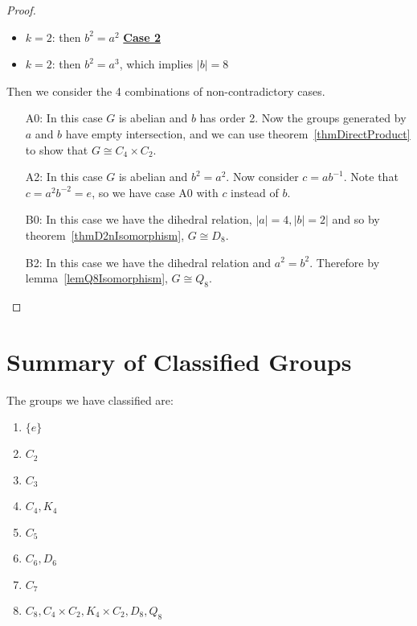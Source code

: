 \documentclass[../Main.tex]{subfiles}
\begin{document}
\begin{proof}
\begin{itemize}
        \item \underline{$k = 2$}: then $b^2 = a^2$ \underline{\textbf{Case 2}}
        \item \underline{$k = 2$}: then $b^2 = a^3$, which implies $|b| =  8$ \contradiction
    \end{itemize}
    Then we consider the 4 combinations of non-contradictory cases.
    \begin{enumerate}
        \item[A0:] In this case $G$ is abelian and $b$ has order 2. Now the groups generated by $a$ and $b$ have empty intersection, and we can use theorem~\ref{thmDirectProduct} to show that $G \cong C_4 \times C_2$.
        \item[A2:] In this case $G$ is abelian and $b^2 = a^2$. Now consider $c = ab^{-1}$. Note that $c = a^2 b^{-2} = e$, so we have case A0 with $c$ instead of $b$.
        \item[B0:] In this case we have the dihedral relation, $|a| = 4, |b| = 2|$ and so by theorem~\ref{thmD2nIsomorphism}, $G \cong D_{8}$.
        \item[B2:] In this case we have the dihedral relation and $a^2 = b^2$. Therefore by lemma~\ref{lemQ8Isomorphism}, $G \cong Q_8$.
    \end{enumerate}
\end{proof}
\section{Summary of Classified Groups}
The groups we have classified are:
\begin{enumerate}
    \item $\{e\}$
    \item $C_2$
    \item $C_3$
    \item $C_4, K_4$
    \item $C_5$
    \item $C_6, D_6$
    \item $C_7$
    \item $C_8, C_4 \times C_2, K_4 \times C_2, D_8, Q_8$
\end{enumerate}
\end{document}
